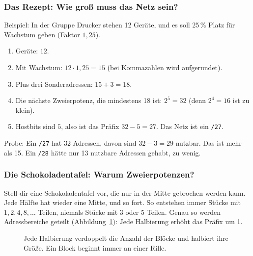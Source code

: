 \documentclass[a4paper,12pt]{article}
\theoremstyle{definition}
\begin{document}
\subsubsection{Das Rezept: Wie groß muss das Netz sein?}

Beispiel: In der Gruppe \glqq Drucker\grqq{} stehen 12 Geräte, und es soll 25\,\% Platz für Wachstum geben (Faktor $1{,}25$).
\begin{enumerate}
	\item Geräte: $12$.
	\item Mit Wachstum: $12 \cdot 1{,}25 = 15$ (bei Kommazahlen wird aufgerundet).
	\item Plus drei Sonderadressen: $15 + 3 = 18$.
	\item Die nächste Zweierpotenz, die mindestens 18 ist: $2^5 = 32$ (denn $2^4 = 16$ ist zu klein).
	\item Hostbits sind $5$, also ist das Präfix $32 - 5 = 27$. Das Netz ist ein \texttt{/27}.
\end{enumerate}
Probe: Ein \texttt{/27} hat 32 Adressen, davon sind $32-3 = 29$ nutzbar. Das ist mehr als 15. Ein \texttt{/28} hätte nur 13 nutzbare Adressen gehabt, zu wenig.

\subsubsection{Die Schokoladentafel: Warum Zweierpotenzen?}

Stell dir eine Schokoladentafel vor, die nur in der Mitte gebrochen werden kann. Jede Hälfte hat wieder eine Mitte, und so fort. So entstehen immer Stücke mit $1, 2, 4, 8, \dots$ Teilen, niemals Stücke mit 3 oder 5 Teilen. Genau so werden Adressbereiche geteilt (Abbildung~\ref{fig:halbierung}): Jede Halbierung erhöht das Präfix um 1.

\begin{figure}[ht]
\centering
{}
\caption{Jede Halbierung verdoppelt die Anzahl der Blöcke und halbiert ihre Größe. Ein Block beginnt immer an einer \glqq Rille\grqq.}
\label{fig:halbierung}
\end{figure}
\end{document}
